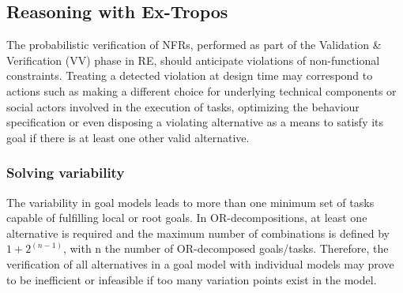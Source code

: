 %
%
%




\subsection{Reasoning with Ex-Tropos}

The probabilistic verification of NFRs, performed as part of the Validation \& Verification (VV) phase in RE, should anticipate violations of non-functional constraints. Treating a detected violation at design time may correspond to actions such as making a different choice for underlying technical components or social actors involved in the execution of tasks, optimizing the behaviour specification or even disposing a violating alternative as a means to satisfy its goal if there is at least one other valid alternative. 


\subsubsection{Solving variability}

The variability in goal models leads to more than one minimum set of tasks capable of fulfilling local or root goals. In OR-decompositions, at least one alternative is required and the maximum number of combinations is defined by $1 + 2^{(n-1)}$, with n the number of OR-decomposed goals/tasks. Therefore, the verification of all alternatives in a goal model with individual models may prove to be inefficient or infeasible if too many variation points exist in the model.

